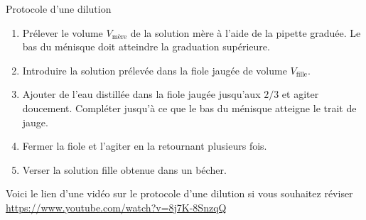 \begin{doc}{Protocole d'une dilution}
  \label{doc:protocole_dilution}
  \begin{center}
  \end{center}
  
  \begin{enumerate}
    \item Prélever le volume $V_\text{mère}$ de la solution mère à l'aide de la pipette graduée.
    Le bas du ménisque doit atteindre la graduation supérieure.
    \item Introduire la solution prélevée dans la fiole jaugée de volume $V_\text{fille}$.
    \item Ajouter de l'eau distillée dans la fiole jaugée jusqu'aux $2/3$ et agiter doucement. Compléter jusqu'à ce que le bas du ménisque atteigne le trait de jauge.
    \item Fermer la fiole et l'agiter en la retournant plusieurs fois.
    \item Verser la solution fille obtenue dans un bécher.
  \end{enumerate}

Voici le lien d'une vidéo sur le protocole d'une dilution si vous souhaitez réviser \url{https://www.youtube.com/watch?v=8j7K-8SnzqQ}
\end{doc}

